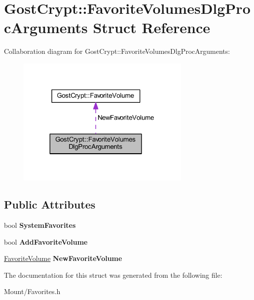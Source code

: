 \hypertarget{struct_gost_crypt_1_1_favorite_volumes_dlg_proc_arguments}{}\section{Gost\+Crypt\+:\+:Favorite\+Volumes\+Dlg\+Proc\+Arguments Struct Reference}
\label{struct_gost_crypt_1_1_favorite_volumes_dlg_proc_arguments}


Collaboration diagram for Gost\+Crypt\+:\+:Favorite\+Volumes\+Dlg\+Proc\+Arguments\+:
\nopagebreak
\begin{figure}[H]
\begin{center}
\leavevmode
\includegraphics[width=239pt]{struct_gost_crypt_1_1_favorite_volumes_dlg_proc_arguments__coll__graph}
\end{center}
\end{figure}
\subsection*{Public Attributes}
\begin{DoxyCompactItemize}
\item 
\mbox{\label{struct_gost_crypt_1_1_favorite_volumes_dlg_proc_arguments_acb2dfc3eb438d76f24699b031b4400f8}} 
bool {\bfseries System\+Favorites}
\item 
\mbox{\label{struct_gost_crypt_1_1_favorite_volumes_dlg_proc_arguments_a10a0b02ad601ce237efa0e18fb401e18}} 
bool {\bfseries Add\+Favorite\+Volume}
\item 
\mbox{\label{struct_gost_crypt_1_1_favorite_volumes_dlg_proc_arguments_a652cce1dad1d04d3a68ff5ce0b455259}} 
\hyperlink{struct_gost_crypt_1_1_favorite_volume}{Favorite\+Volume} {\bfseries New\+Favorite\+Volume}
\end{DoxyCompactItemize}


The documentation for this struct was generated from the following file\+:\begin{DoxyCompactItemize}
\item 
Mount/Favorites.\+h\end{DoxyCompactItemize}
